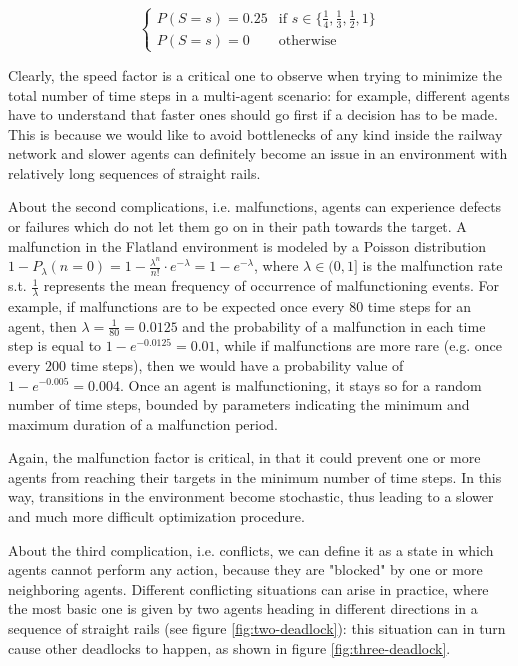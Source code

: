 \documentclass[a4paper,10pt]{report}
\begin{document}
\begin{equation*}
	\begin{cases}
		P(S=s) = 0.25 & \text{if } s \in \{\frac{1}{4}, \frac{1}{3}, \frac{1}{2}, 1\} \\
		P(S=s) = 0    & \text{otherwise}
	\end{cases}
\end{equation*}

Clearly, the speed factor is a critical one to observe when trying to minimize the total number of time steps in a multi-agent scenario: for example, different agents have to understand that faster ones should go first if a decision has to be made. This is because we would like to avoid bottlenecks of any kind inside the railway network and slower agents can definitely become an issue in an environment with relatively long sequences of straight rails.

About the second complications, i.e. malfunctions, agents can experience defects or failures which do not let them go on in their path towards the target. A malfunction in the Flatland environment is modeled by a Poisson distribution $1 - P_{\lambda}(n=0)=1 - \frac{\lambda^{n}}{n!}\cdot e^{-\lambda}=1 - e^{-\lambda}$, where $\lambda \in (0, 1]$ is the malfunction rate s.t. $\frac{1}{\lambda}$ represents the mean frequency of occurrence of malfunctioning events. For example, if malfunctions are to be expected once every $80$ time steps for an agent, then $\lambda=\frac{1}{80}=0.0125$ and the probability of a malfunction in each time step is equal to $1-e^{-0.0125}=0.01$, while if malfunctions are more rare (e.g. once every $200$ time steps), then we would have a probability value of $1-e^{-0.005}=0.004$. Once an agent is malfunctioning, it stays so for a random number of time steps, bounded by parameters indicating the minimum and maximum duration of a malfunction period.

Again, the malfunction factor is critical, in that it could prevent one or more agents from reaching their targets in the minimum number of time steps. In this way, transitions in the environment become stochastic, thus leading to a slower and much more difficult optimization procedure.

About the third complication, i.e. conflicts, we can define it as a state in which agents cannot perform any action, because they are "blocked" by one or more neighboring agents. Different conflicting situations can arise in practice, where the most basic one is given by two agents heading in different directions in a sequence of straight rails (see figure \ref{fig:two-deadlock}): this situation can in turn cause other deadlocks to happen, as shown in figure \ref{fig:three-deadlock}.
\end{document}
